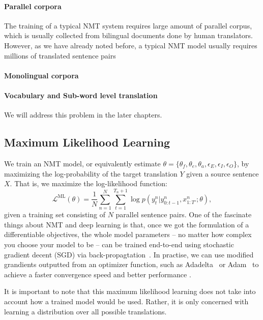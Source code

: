 \paragraph{Parallel corpora} The training  of a typical NMT system requires large amount of parallel corpus, which is usually collected from bilingual documents done by human translators.  However, as we have already noted before, a typical NMT model usually requires millions of translated sentence pairs
\paragraph{Monolingual corpora}
\paragraph{Vocabulary and Sub-word level translation}  
We will address this problem in the later chapters.

\subsection{Maximum Likelihood Learning}
\label{cp2.sec.mle}
We train an NMT model, or equivalently estimate $\theta =\{\theta_f, \theta_e, \theta_a, \epsilon_E, \epsilon_I, \epsilon_O \}$, by maximizing the log-probability of the target translation $Y$ given a source sentence $X$. That is, we maximize the log-likelihood function:
\begin{equation}
	\label{cp2.eq.learning}
    \mathcal{L}^{\text{ML}}(\theta)  = \frac{1}{N} \sum_{n=1}^N \sum_{t=1}^{T_n+1} \log p(y_t^n| y_{0:t-1}^n, x_{1:T'}^n; \theta),
\end{equation}
given a training set consisting of $N$ parallel sentence pairs. One of the fascinate things about NMT and deep learning is that, once we got the formulation of a differentiable objectives, the whole model parameters -- no matter how complex you choose your model to be -- can be trained end-to-end using stochastic gradient decent (SGD) via back-propagtation~\cite{rumelhart1986learning}. In practise, we can use modified grandients outputted from an optimizer function, such as Adadelta~\cite{zeiler2012adadelta} or Adam~\cite{kingma2014adam} to achieve a faster convergence speed and better performance .

It is important to note that this maximum likelihood learning does not take into account how a trained model would be used. Rather, it is only concerned with learning a distribution over all possible translations. 

